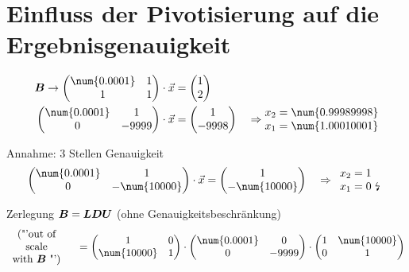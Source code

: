 \section{Einfluss der Pivotisierung auf die Ergebnisgenauigkeit}
\begin{align}
	\ma{B}\rightarrow\begin{pmatrix}
	\num{0.0001} & 1 \\ 1 & 1
	\end{pmatrix}\cdot\vec{x} &= \begin{pmatrix}
	1\\ 2
	\end{pmatrix}\\
	\begin{pmatrix}
	\num{0.0001} & 1 \\ 0 & -9999
	\end{pmatrix}\cdot\vec{x} &= \begin{pmatrix}
	1\\ -9998
	\end{pmatrix}\quad\Rightarrow\begin{matrix}
	x_2 = \num{0.99989998}\\ x_1 = \num{1.00010001}
	\end{matrix}
\end{align}

Annahme: 3 Stellen Genauigkeit
\begin{align}
	\begin{pmatrix}
	\num{0.0001} & 1 \\ 0 & -\num{10000}
	\end{pmatrix}\cdot\vec{x} = \begin{pmatrix}
	1\\ -\num{10000}
	\end{pmatrix}\quad\Rightarrow\begin{array}{l}
	x_2 = 1\\ x_1 = 0\text{ \lightning}
	\end{array}
\end{align}

Zerlegung $\boldsymbol {B} = \boldsymbol {L}\boldsymbol {D}\boldsymbol {U}$ (ohne Genauigkeitsbeschränkung)
\begin{align}
	\begin{array}{c}
	\text{("'out of}\\ \text{scale}\\ \text{with }\ma{B}\text{ "')}
	\end{array}\quad = \begin{pmatrix}
	1 & 0 \\
	\num{10000} & 1
	\end{pmatrix}\cdot\begin{pmatrix}
	\num{0.0001} & 0 \\ 0 & -9999
	\end{pmatrix}\cdot\begin{pmatrix}
	1 & \num{10000} \\
	0 & 1
	\end{pmatrix}
\end{align}

